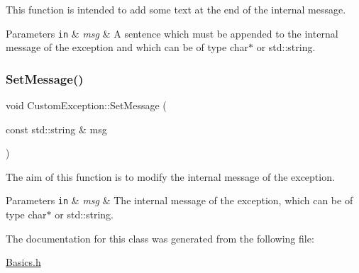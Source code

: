 This function is intended to add some text at the end of the internal message. 


\begin{DoxyParams}[1]{Parameters}
\mbox{\tt in}  & {\em msg} & A sentence which must be appended to the internal message of the exception and which can be of type {\ttfamily char$\ast$} or {\ttfamily std\+::string}. \\
\hline
\end{DoxyParams}
\mbox{\label{classCustomException_a54289001348effb40f5780bb7f263abb}} 
\subsubsection{\texorpdfstring{Set\+Message()}{SetMessage()}}
{\footnotesize\ttfamily void Custom\+Exception\+::\+Set\+Message (\begin{DoxyParamCaption}\item[{const std\+::string \&}]{msg }\end{DoxyParamCaption})\hspace{0.3cm}{\ttfamily [inline]}}



The aim of this function is to modify the internal message of the exception. 


\begin{DoxyParams}[1]{Parameters}
\mbox{\tt in}  & {\em msg} & The internal message of the exception, which can be of type {\ttfamily char$\ast$} or {\ttfamily std\+::string}. \\
\hline
\end{DoxyParams}


The documentation for this class was generated from the following file\+:\begin{DoxyCompactItemize}
\item 
\hyperlink{Basics_8h}{Basics.\+h}\end{DoxyCompactItemize}
